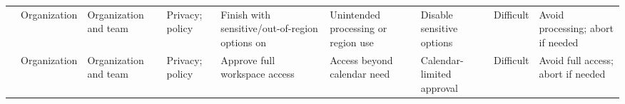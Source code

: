 \begin{landscape}
\begin{longtable}{L{.12\linewidth}L{.06\linewidth}L{.08\linewidth}L{.08\linewidth}L{.10\linewidth}L{.11\linewidth}L{.11\linewidth}L{.06\linewidth}L{.09\linewidth}}
 & Organization & Organization and team & Privacy; policy & Finish with sensitive/out-of-region options on & Unintended processing or region use & Disable sensitive options & Difficult & Avoid processing; abort if needed \\
 & Organization & Organization and team & Privacy; policy & Approve full workspace access & Access beyond calendar need & Calendar-limited approval & Difficult & Avoid full access; abort if needed \\
\bottomrule
\end{longtable}
\end{landscape}
